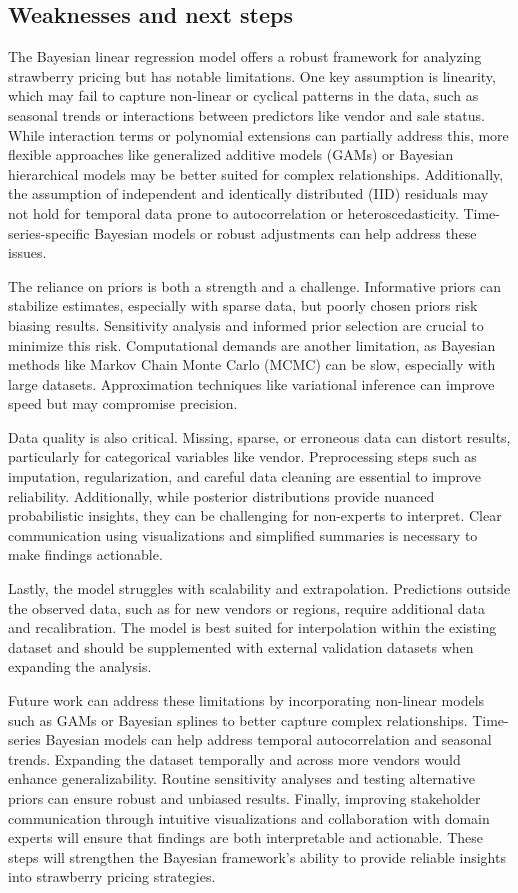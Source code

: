 \documentclass[
  letterpaper,
  DIV=11,
  numbers=noendperiod]{scrartcl}
\begin{document}
\subsection{Weaknesses and next steps}\label{weaknesses-and-next-steps}

The Bayesian linear regression model offers a robust framework for
analyzing strawberry pricing but has notable limitations. One key
assumption is linearity, which may fail to capture non-linear or
cyclical patterns in the data, such as seasonal trends or interactions
between predictors like vendor and sale status. While interaction terms
or polynomial extensions can partially address this, more flexible
approaches like generalized additive models (GAMs) or Bayesian
hierarchical models may be better suited for complex relationships.
Additionally, the assumption of independent and identically distributed
(IID) residuals may not hold for temporal data prone to autocorrelation
or heteroscedasticity. Time-series-specific Bayesian models or robust
adjustments can help address these issues.

The reliance on priors is both a strength and a challenge. Informative
priors can stabilize estimates, especially with sparse data, but poorly
chosen priors risk biasing results. Sensitivity analysis and informed
prior selection are crucial to minimize this risk. Computational demands
are another limitation, as Bayesian methods like Markov Chain Monte
Carlo (MCMC) can be slow, especially with large datasets. Approximation
techniques like variational inference can improve speed but may
compromise precision.

Data quality is also critical. Missing, sparse, or erroneous data can
distort results, particularly for categorical variables like vendor.
Preprocessing steps such as imputation, regularization, and careful data
cleaning are essential to improve reliability. Additionally, while
posterior distributions provide nuanced probabilistic insights, they can
be challenging for non-experts to interpret. Clear communication using
visualizations and simplified summaries is necessary to make findings
actionable.

Lastly, the model struggles with scalability and extrapolation.
Predictions outside the observed data, such as for new vendors or
regions, require additional data and recalibration. The model is best
suited for interpolation within the existing dataset and should be
supplemented with external validation datasets when expanding the
analysis.

Future work can address these limitations by incorporating non-linear
models such as GAMs or Bayesian splines to better capture complex
relationships. Time-series Bayesian models can help address temporal
autocorrelation and seasonal trends. Expanding the dataset temporally
and across more vendors would enhance generalizability. Routine
sensitivity analyses and testing alternative priors can ensure robust
and unbiased results. Finally, improving stakeholder communication
through intuitive visualizations and collaboration with domain experts
will ensure that findings are both interpretable and actionable. These
steps will strengthen the Bayesian framework's ability to provide
reliable insights into strawberry pricing strategies.
\end{document}

